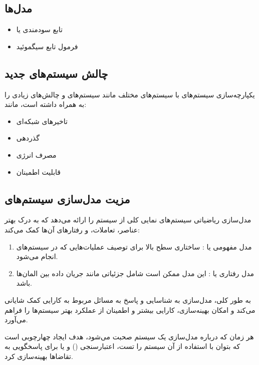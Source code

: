 \subsection{مدل‌ها}

\begin{itemize}
    \item تابع سودمندی یا 
    \item فرمول تابع سیگموئید
\end{itemize}

\subsection{چالش سیستم‌های جدید}

یکپارچه‌سازی سیستم‌های  با سیستم‌های مختلف مانند سیستم‌های  و
 چالش‌های زیادی را به همراه داشته است، مانند:

\begin{itemize}
    \item تاخیر‌های شبکه‌ای
    \item گذردهی
    \item مصرف انرژی
    \item قابلیت اطمینان
\end{itemize}

\subsection{مزیت مدل‌سازی سیستم‌های }

مدل‌سازی ریاضیاتی سیستم‌های  نمایی کلی از سیستم را ارائه می‌دهد که به
درک بهتر عناصر، تعاملات، و رفتارهای آن‌ها کمک می‌کند:

\begin{enumerate} 
    \item مدل مفهومی یا : ساختاری سطح بالا برای توصیف
    عملیات‌هایی که در سیستم‌های  انجام می‌شود. 
    \item مدل رفتاری یا : این مدل ممکن است شامل جزئیاتی
    مانند جریان داده بین المان‌ها باشد. 
\end{enumerate}

به طور کلی، مدل‌سازی به شناسایی و پاسخ به مسائل مربوط به کارایی کمک شایانی
می‌کند و امکان بهینه‌سازی، کارایی بیشتر و اطمینان از عملکرد بهتر سیستم‌ها را
فراهم می‌آورد.

هر زمان که درباره مدل‌سازی یک سیستم  صحبت می‌شود، هدف ایجاد چهارچوبی است
که بتوان با استفاده از آن سیستم را تست، اعتبارسنجی () و یا برای
پاسخگویی به تقاضاها بهینه‌سازی کرد.

